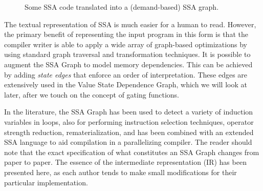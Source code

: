 \begin{figure}[ht]
\centering
{}

\caption{Some SSA code translated into a (demand-based) SSA graph.}
\label{fig: ssa-graph-example-code}
\end{figure}

The textual representation of SSA is much easier for a human to read. However, the primary benefit of representing the input program in this form is that the compiler writer is able to apply a wide array of graph-based optimizations by using standard graph traversal and transformation techniques. It is possible to augment the SSA Graph to model memory dependencies. This can be achieved by adding \textit{state edges} that enforce an order of interpretation. These edges are extensively used in the Value State Dependence Graph, which we will look at later, after we touch on the concept of gating functions.

In the literature, the SSA Graph has been used to detect a variety of induction variables in loops, also for performing instruction selection techniques, operator strength reduction, rematerialization, and has been combined with an extended SSA language to aid compilation in a parallelizing compiler. The reader should note that the exact specification of what constitutes an SSA Graph changes from paper to paper. The essence of the intermediate representation (IR) has been presented here, as each author tends to make small modifications for their particular implementation.

